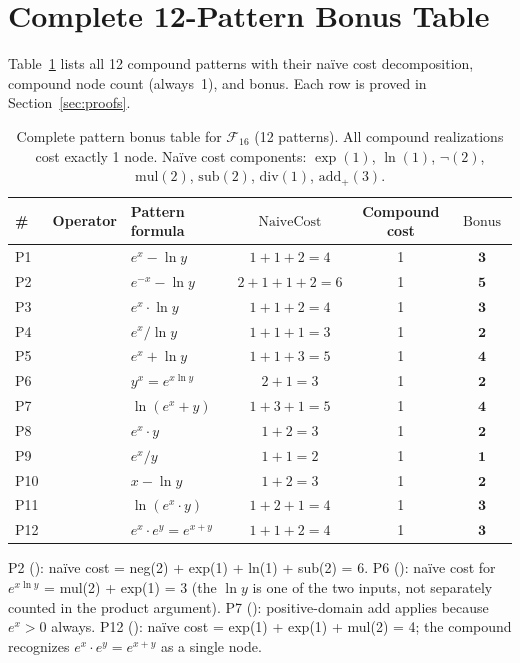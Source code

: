 \documentclass[12pt,a4paper]{article}
\theoremstyle{definition}
\newcommand{\EML}{\operatorname{EML}}
\newcommand{\EDL}{\operatorname{EDL}}
\newcommand{\EXL}{\operatorname{EXL}}
\newcommand{\EAL}{\operatorname{EAL}}
\newcommand{\EMN}{\operatorname{EMN}}
\newcommand{\DEML}{\operatorname{DEML}}
\newcommand{\ELAd}{\operatorname{ELAd}}
\newcommand{\ELSb}{\operatorname{ELSb}}
\newcommand{\LEAd}{\operatorname{LEAd}}
\newcommand{\LEdiv}{\operatorname{LEdiv}}
\newcommand{\LEprod}{\operatorname{LEprod}}
\newcommand{\EPL}{\operatorname{EPL}}
\newcommand{\NC}{\operatorname{NaiveCost}}
\newcommand{\Bonus}{\operatorname{Bonus}}
\begin{document}
\section{Complete 12-Pattern Bonus Table}
\label{sec:table}

Table~\ref{tab:bonuses} lists all 12 compound patterns with their
na\"{i}ve cost decomposition, compound node count (always~1), and bonus.
Each row is proved in Section~\ref{sec:proofs}.

\begin{table}[h]
\centering
\caption{Complete pattern bonus table for $\mathcal{F}_{16}$ (12 patterns).
         All compound realizations cost exactly 1 node.
         Na\"{i}ve cost components: $\exp(1)$, $\ln(1)$, $\neg(2)$, $\mathrm{mul}(2)$,
         $\mathrm{sub}(2)$, $\mathrm{div}(1)$, $\mathrm{add}_+(3)$.}
\label{tab:bonuses}
\smallskip
\begin{tabular}{@{}lllccc@{}}
\toprule
\textbf{\#} &
\textbf{Operator} &
\textbf{Pattern formula} &
$\NC$ &
\textbf{Compound cost} &
$\Bonus$ \\
\midrule
P1  & \EML   & $e^x - \ln y$          & $1+1+2=4$   & 1 & $\mathbf{3}$ \\
P2  & \DEML  & $e^{-x} - \ln y$       & $2+1+1+2=6$ & 1 & $\mathbf{5}$ \\
P3  & \EXL   & $e^x \cdot \ln y$      & $1+1+2=4$   & 1 & $\mathbf{3}$ \\
P4  & \EDL   & $e^x / \ln y$          & $1+1+1=3$   & 1 & $\mathbf{2}$ \\
P5  & \EAL   & $e^x + \ln y$          & $1+1+3=5$   & 1 & $\mathbf{4}$ \\
P6  & \EPL   & $y^x = e^{x \ln y}$    & $2+1=3$     & 1 & $\mathbf{2}$ \\
P7  & \LEAd  & $\ln(e^x + y)$         & $1+3+1=5$   & 1 & $\mathbf{4}$ \\
P8  & \ELAd  & $e^x \cdot y$          & $1+2=3$     & 1 & $\mathbf{2}$ \\
P9  & \ELSb  & $e^x / y$              & $1+1=2$     & 1 & $\mathbf{1}$ \\
P10 & \LEdiv & $x - \ln y$            & $1+2=3$     & 1 & $\mathbf{2}$ \\
P11 & \LEprod& $\ln(e^x \cdot y)$     & $1+2+1=4$   & 1 & $\mathbf{3}$ \\
P12 & \EMN   & $e^x \cdot e^y = e^{x+y}$ & $1+1+2=4$ & 1 & $\mathbf{3}$ \\
\bottomrule
\end{tabular}

\smallskip
\footnotesize{%
P2 (\DEML): na\"{i}ve cost = neg(2) + exp(1) + ln(1) + sub(2) = 6.
P6 (\EPL): na\"{i}ve cost for $e^{x \ln y}$ = mul(2) + exp(1) = 3
(the $\ln y$ is one of the two inputs, not separately counted in the
product argument).
P7 (\LEAd): positive-domain add applies because $e^x > 0$ always.
P12 (\EMN): na\"{i}ve cost = exp(1) + exp(1) + mul(2) = 4; the compound
recognizes $e^x \cdot e^y = e^{x+y}$ as a single node.
}
\end{table}
\end{document}
